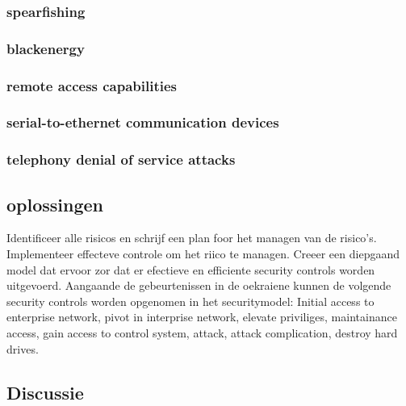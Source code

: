 \documentclass{article}
\begin{document}
	\subsubsection{spearfishing}
	\subsubsection{blackenergy}
	\subsubsection{remote access capabilities}
	\subsubsection{serial-to-ethernet communication devices}
	\subsubsection{telephony denial of service attacks}
	
	\subsection{oplossingen}
	Identificeer alle risicos en schrijf een plan foor het managen van de risico's.
	Implementeer  effecteve controle  om het riico te managen.
	Creeer een diepgaand model dat ervoor zor dat er efectieve en efficiente security controls worden uitgevoerd.
	Aangaande de gebeurtenissen in de oekraiene kunnen de volgende security controls worden opgenomen in het securitymodel: Initial access to enterprise network, pivot in interprise network, elevate priviliges, maintainance access, gain access to control system, attack, attack complication, destroy hard drives.
	\cite{Whitehead2017ukrainepoweroutage}
	
	\subsection{Discussie}
	
\end{document}
